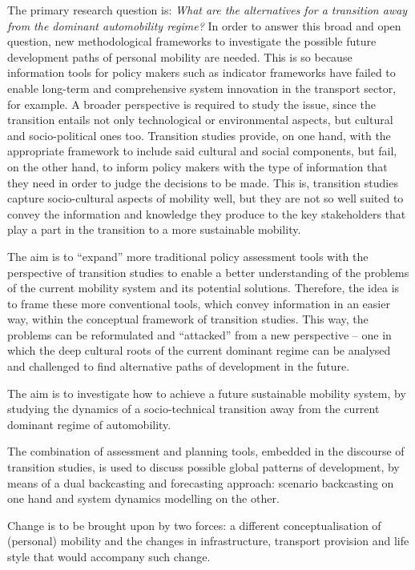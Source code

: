 The primary research question is: \textit{What are the alternatives for a transition away from the dominant automobility regime?} In order to answer this broad and open question, new methodological frameworks to investigate the possible future development paths of personal mobility are needed. This is so because information tools for policy makers such as indicator frameworks have failed to enable long-term and comprehensive system innovation in the transport sector, for example. A broader perspective is required to study the issue, since the transition entails not only technological or environmental aspects, but cultural and socio-political ones too. Transition studies provide, on one hand, with the appropriate framework to include said cultural and social components, but fail, on the other hand, to inform policy makers with the type of information that they need in order to judge the decisions to be made. This is, transition studies capture socio-cultural aspects of mobility well, but they are not so well suited to convey the information and knowledge they produce to the key stakeholders that play a part in the transition to a more sustainable mobility.

The aim is to ``expand'' more traditional policy assessment tools with the perspective of transition studies to enable a better understanding of the problems of the current mobility system and its potential solutions. Therefore, the idea is to frame these more conventional tools, which convey information in an easier way, within the conceptual framework of transition studies. This way, the problems can be reformulated and ``attacked'' from a new perspective -- one in which the deep cultural roots of the current dominant regime can be analysed and challenged to find alternative paths of development in the future.

The aim is to investigate how to achieve a future sustainable mobility system, by studying the dynamics of a socio-technical transition away from the current dominant regime of automobility.

The combination of assessment and planning tools, embedded in the discourse of transition studies, is used to discuss possible global patterns of development, by means of a dual backcasting and forecasting approach: scenario backcasting on one hand and system dynamics modelling on the other.

Change is to be brought upon by two forces: a different conceptualisation of (personal) mobility and the changes in infrastructure, transport provision and life style that would accompany such change.